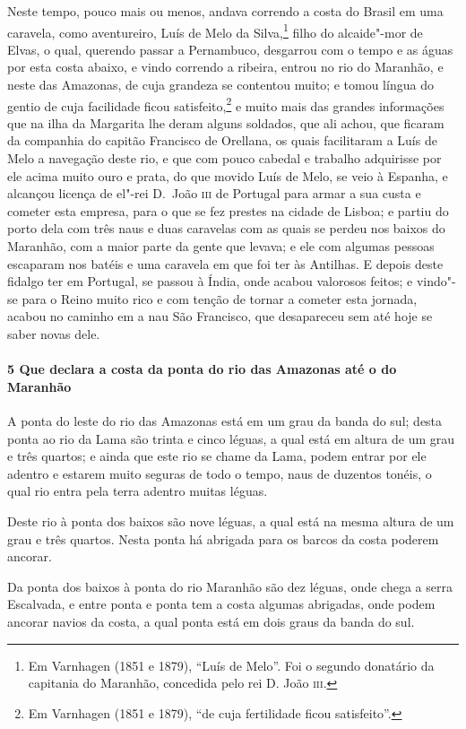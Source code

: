 Neste tempo, pouco mais ou menos, andava correndo a costa do Brasil em uma caravela, como
aventureiro, Luís de Melo da Silva,\footnote{ Em Varnhagen (1851 e 1879), ``Luís de Melo''.
Foi o segundo donatário da capitania do Maranhão, concedida pelo rei D. João
\textsc{iii}.} filho do alcaide"-mor de Elvas, o qual, querendo passar a Pernambuco,
desgarrou com o tempo e as águas por esta costa abaixo, e vindo correndo a ribeira, entrou
no rio do Maranhão, e neste das Amazonas, de cuja grandeza se contentou muito; e tomou
língua do gentio de cuja facilidade ficou satisfeito,\footnote{ Em Varnhagen (1851 e
1879), ``de cuja fertilidade ficou satisfeito''.} e muito mais das grandes informações que
na ilha da Margarita lhe deram alguns soldados, que ali achou, que ficaram da companhia do
capitão Francisco de Orellana, os quais facilitaram a Luís de Melo a navegação deste rio,
e que com pouco cabedal e trabalho adquirisse por ele acima muito ouro e prata, do que
movido Luís de Melo, se veio à Espanha, e alcançou licença de el"-rei D.~João \textsc{iii}
de Portugal para armar a sua custa e cometer esta empresa, para o que se fez prestes na
cidade de Lisboa; e partiu do porto dela com três naus e duas caravelas com as quais se
perdeu nos baixos do Maranhão, com a maior parte da gente que levava; e ele com algumas
pessoas escaparam nos batéis e uma caravela em que foi ter às Antilhas. E depois deste
fidalgo ter em Portugal, se passou à Índia, onde acabou valorosos feitos; e vindo"-se para
o Reino muito rico e com tenção de tornar a cometer esta jornada, acabou no caminho em a
nau São Francisco, que desapareceu sem até hoje se saber novas dele.

\paragraph{5 Que declara a costa da ponta do rio das Amazonas até o do Maranhão}

A ponta do leste do rio das Amazonas está em um grau da banda do sul; desta ponta ao rio
da Lama são trinta e cinco léguas, a qual está em altura de um grau e três quartos; e
ainda que este rio se chame da Lama, podem entrar por ele adentro e estarem muito seguras
de todo o tempo, naus de duzentos tonéis, o qual rio entra pela terra adentro muitas
léguas.

Deste rio à ponta dos baixos são nove léguas, a qual está na mesma altura de um grau e
três quartos. Nesta ponta há abrigada para os barcos da costa poderem ancorar.

Da ponta dos baixos à ponta do rio Maranhão são dez léguas, onde chega a serra Escalvada,
e entre ponta e ponta tem a costa algumas abrigadas, onde podem ancorar navios da costa, a
qual ponta está em dois graus da banda do sul.

